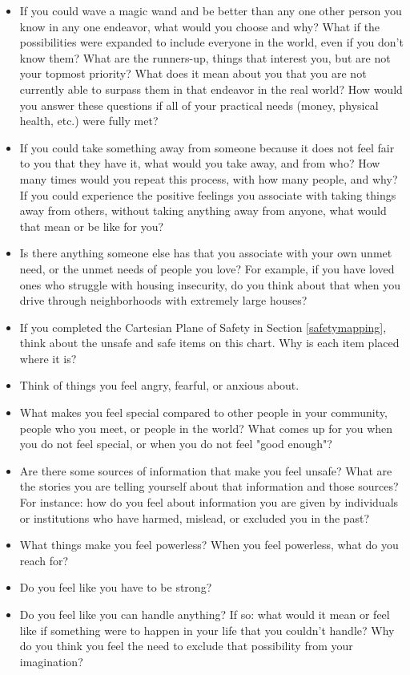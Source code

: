 \documentclass[12pt,letterpaper]{book}
\begin{document}
\begin{itemize}
    \item If you could wave a magic wand and be better than any one other person you know in any one endeavor, what would you choose and why? What if the possibilities were expanded to include everyone in the world, even if you don't know them? What are the runners-up, things that interest you, but are not your topmost priority? What does it mean about you that you are not currently able to surpass them in that endeavor in the real world? How would you answer these questions if all of your practical needs (money, physical health, etc.) were fully met?
    \item If you could take something away from someone because it does not feel fair to you that they have it, what would you take away, and from who? How many times would you repeat this process, with how many people, and why? If you could experience the positive feelings you associate with taking things away from others, without taking anything away from anyone, what would that mean or be like for you?
    \item Is there anything someone else has that you associate with your own unmet need, or the unmet needs of people you love? For example, if you have loved ones who struggle with housing insecurity, do you think about that when you drive through neighborhoods with extremely large houses?
    \item If you completed the Cartesian Plane of Safety in Section \ref{safetymapping}, think about the unsafe and safe items on this chart. Why is each item placed where it is?
    \item Think of things you feel angry, fearful, or anxious about. 
    \item What makes you feel special compared to other people in your community, people who you meet, or people in the world? What comes up for you when you do not feel special, or when you do not feel "good enough"?
    \item Are there some sources of information that make you feel unsafe? What are the stories you are telling yourself about that information and those sources? For instance: how do you feel about information you are given by individuals or institutions who have harmed, mislead, or excluded you in the past?
    \item What things make you feel powerless? When you feel powerless, what do you reach for?
    \item Do you feel like you have to be strong?
    \item Do you feel like you can handle anything? If so: what would it mean or feel like if something were to happen in your life that you couldn't handle? Why do you think you feel the need to exclude that possibility from your imagination?

\end{itemize}
\end{document}
